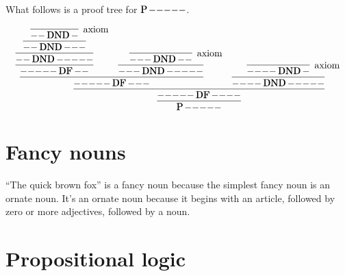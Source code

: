 \documentclass[11pt,letterpaper]{article}
\DeclareMathOperator{\isprime}{\mathqd{P}}
\DeclareMathOperator{\df}{\mathqd{DF}}
\DeclareMathOperator{\dnd}{\mathqd{DND}}
\newcommand{\hy}{\mathtt{-}}
\begin{document}
What follows is a proof tree for $\isprime \hy\hy\hy\hy\hy$.

\begin{equation*}
  \infer{\isprime \hy\hy\hy\hy\hy}{
    \infer{\hy\hy\hy\hy\hy \df \hy\hy\hy\hy}{
      \infer{\hy\hy\hy\hy\hy \df \hy\hy\hy}{
        \infer{\hy\hy\hy\hy\hy \df \hy\hy}{
          \infer{\hy\hy \dnd \hy\hy\hy\hy\hy}{
            \infer{\hy\hy \dnd \hy\hy\hy}{
              \infer[\text{axiom}]{\hy\hy \dnd \hy}{}
            }
          }
        }
        &
        \infer{\hy\hy\hy \dnd \hy\hy\hy\hy\hy}{
          \infer[\text{axiom}]{\hy\hy\hy \dnd \hy\hy}{}
        }
      }
      &
      \infer{\hy\hy\hy\hy \dnd \hy\hy\hy\hy\hy}{
        \infer[\text{axiom}]{\hy\hy\hy\hy \dnd \hy}{}
      }
    }
  }
\end{equation*}

\section{Fancy nouns}

``The quick brown fox'' is a fancy noun because the simplest fancy noun is an
ornate noun. It's an ornate noun because it begins with an article, followed by
zero or more adjectives, followed by a noun.

\section{Propositional logic}
\end{document}

